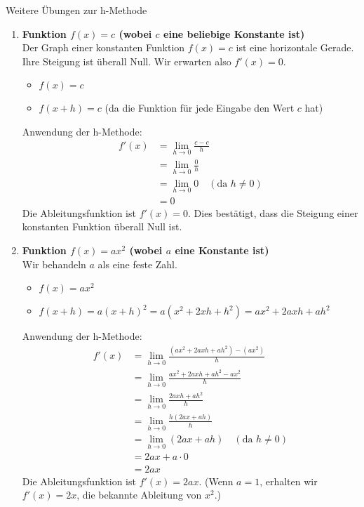 \begin{loesungsumgebung}{Weitere Übungen zur h-Methode}
\begin{enumerate}[label=(\alph*)]
    \item \textbf{Funktion $f(x) = c$ (wobei $c$ eine beliebige Konstante ist)} \\
    Der Graph einer konstanten Funktion $f(x)=c$ ist eine horizontale Gerade. Ihre Steigung ist überall Null. Wir erwarten also $f'(x)=0$.
    \begin{itemize}
        \item $f(x) = c$
        \item $f(x+h) = c$ (da die Funktion für jede Eingabe den Wert $c$ hat)
    \end{itemize}
    Anwendung der h-Methode:
    \begin{align*}
    f'(x) &= \lim_{h \to 0} \frac{c - c}{h} \\
          &= \lim_{h \to 0} \frac{0}{h} \\
          &= \lim_{h \to 0} 0 \quad (\text{da } h \neq 0) \\
          &= 0
    \end{align*}
    Die Ableitungsfunktion ist $f'(x) = 0$. Dies bestätigt, dass die Steigung einer konstanten Funktion überall Null ist.

    \item \textbf{Funktion $f(x) = ax^2$ (wobei $a$ eine Konstante ist)} \\
    Wir behandeln $a$ als eine feste Zahl.
    \begin{itemize}
        \item $f(x) = ax^2$
        \item $f(x+h) = a(x+h)^2 = a(x^2 + 2xh + h^2) = ax^2 + 2axh + ah^2$
    \end{itemize}
    Anwendung der h-Methode:
    \begin{align*}
    f'(x) &= \lim_{h \to 0} \frac{(ax^2 + 2axh + ah^2) - (ax^2)}{h} \\
          &= \lim_{h \to 0} \frac{ax^2 + 2axh + ah^2 - ax^2}{h} \\
          &= \lim_{h \to 0} \frac{2axh + ah^2}{h} \\
          &= \lim_{h \to 0} \frac{h(2ax + ah)}{h} \\
          &= \lim_{h \to 0} (2ax + ah) \quad (\text{da } h \neq 0) \\
          &= 2ax + a \cdot 0 \\
          &= 2ax
    \end{align*}
    Die Ableitungsfunktion ist $f'(x) = 2ax$. (Wenn $a=1$, erhalten wir $f'(x)=2x$, die bekannte Ableitung von $x^2$.)
\end{enumerate}

\end{loesungsumgebung}



